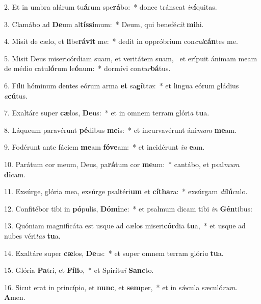 2. Et in umbra alárum tu\textbf{á}rum spe\textbf{rá}bo:~*  donec tránseat \textit{in}\textbf{í}quitas.\

3. Clamábo ad \textbf{De}um al\textbf{tís}\textbf{si}mum:~*  Deum, qui benefé\textit{cit} \textbf{mi}hi.\

4. Misit de cælo, et \textbf{li}be\textbf{rá}\textbf{vit} me:~*  dedit in oppróbrium con\textit{cul}\textbf{cán}tes me.\

5. Misit Deus misericórdiam suam, et veritátem suam, \dag\  et erípuit ánimam meam de médio catu\textbf{ló}rum le\textbf{ó}num:~*  dormívi con\textit{tur}\textbf{bá}tus.\

6. Fílii hóminum dentes eórum arma \textbf{et} sa\textbf{gít}tæ:~*  et lingua eórum gládius \textit{a}\textbf{cú}tus.\

7. Exaltáre super \textbf{cæ}los, \textbf{De}us:~*  et in omnem terram glóri\textit{a} \textbf{tu}a.\

8. Láqueum paravérunt \textbf{pé}dibus \textbf{me}is:~*  et incurvavérunt áni\textit{mam} \textbf{me}am.\

9. Fodérunt ante fáciem \textbf{me}am \textbf{fó}\textbf{ve}am:~*  et incidérunt \textit{in} \textbf{e}am.\

10. Parátum cor meum, Deus, pa\textbf{rá}tum cor \textbf{me}um:~*  cantábo, et psal\textit{mum} \textbf{di}cam.\

11. Exsúrge, glória mea, exsúrge psaltéri\textbf{um} et \textbf{cí}\textbf{tha}ra:~*  exsúrgam \textit{di}\textbf{lú}culo.\

12. Confitébor tibi in \textbf{pó}pulis, \textbf{Dó}\textbf{mi}ne:~*  et psalmum dicam tibi \textit{in} \textbf{Gén}tibus:\

13. Quóniam magnificáta est usque ad cælos miseri\textbf{cór}dia \textbf{tu}a,~*  et usque ad nubes véri\textit{tas} \textbf{tu}a.\

14. Exaltáre super \textbf{cæ}los, \textbf{De}us:~*  et super omnem terram glóri\textit{a} \textbf{tu}a.\

15. Glória \textbf{Pa}tri, et \textbf{Fí}\textbf{li}o,~*  et Spirítu\textit{i} \textbf{Sanc}to.\

16. Sicut erat in princípio, et \textbf{nunc}, et \textbf{sem}per,~*  et in sǽcula sæculó\textit{rum}. \textbf{A}men.\

